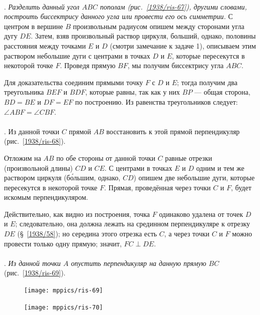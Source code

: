 \documentclass[twoside]{book}
\begin{document}
\paragraph{}\label{1938/64}
\mbox{.}
\emph{Разделить данный угол $ABC$ пополам (рис.~\ref{1938/ris-67}), другими словами, построить биссектрису данного угла или провести его ось симметрии.}
С центром в вершине $B$ произвольным радиусом опишем между сторонами угла дугу $DE$.
Затем, взяв произвольный раствор циркуля, больший, однако, половины расстояния между точками $E$ и $D$ (смотри замечание к задаче 1), описываем этим раствором небольшие дуги с центрами в точках $D$ и $E$, которые пересекутся в некоторой точке $F$.
Проведя прямую $BF$, мы получим биссектрису угла $ABC$.


Для доказательства соединим прямыми точку $F$ с $D$ и $E$;
тогда получим два треугольника $BEF$ и $BDF$, которые равны, так как у них $BP$ — общая сторона, $BD=BE$ и $DF=EF$ по построению.
Из равенства треугольников следует:
$\angle ABF = \angle CBF$.

\paragraph{}\label{1938/65}
.
Из данной точки $C$ прямой $AB$ восстановить к этой прямой перпендикуляр (рис.~\ref{1938/ris-68}).

Отложим на $AB$ по обе стороны от данной точки $C$ равные отрезки (произвольной длины) $CD$ и $CE$.
С центрами в точках $E$ и $D$ одним и тем же раствором циркуля (б\'{о}льшим, однако, $CD$) опишем две небольшие дуги, которые пересекутся в некоторой точке $F$.
Прямая, проведённая через точки $C$ и $F$, будет искомым перпендикуляром.

Действительно, как видно из построения, точка $F$ одинаково удалена от точек $D$ и $E$;
следовательно, она должна лежать на срединном перпендикуляре к отрезку $DE$ (§~\ref{1938/58});
но середина этого отрезка есть $C$, а через точки $C$ и $F$ можно провести только одну прямую;
значит, $FC \perp DE$.

\paragraph{}\label{1938/66}
.
\emph{Из данной точки $A$ опустить перпендикуляр на данную прямую $BC$} (рис.~\ref{1938/ris-69}).

\begin{figure}
\centering
\texttt{[image: mppics/ris-69]}
\caption{}\label{1938/ris-69}
\bigskip
\texttt{[image: mppics/ris-70]}
\caption{}\label{1938/ris-70}
\end{figure}
\end{document}

